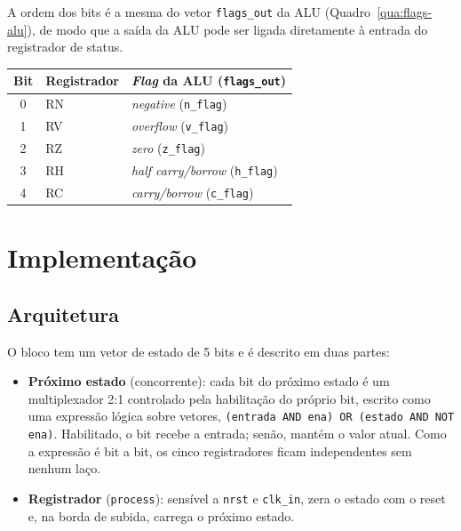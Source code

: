 A ordem dos bits é a mesma do vetor \texttt{flags\_out} da ALU (Quadro~\ref{qua:flags-alu}), de modo que a saída da ALU pode ser ligada diretamente à entrada do registrador de status.

\begin{quadro}[htb]
  \caption{Correspondência entre as \textit{flags} da ALU e os registradores de status.}
  \label{qua:flags-alu}
  \centering
  \begin{tabular}{cll}
    \hline
    Bit & Registrador & \textit{Flag} da ALU (\texttt{flags\_out}) \\ \hline
    0 & RN & \textit{negative} (\texttt{n\_flag}) \\
    1 & RV & \textit{overflow} (\texttt{v\_flag}) \\
    2 & RZ & \textit{zero} (\texttt{z\_flag}) \\
    3 & RH & \textit{half carry/borrow} (\texttt{h\_flag}) \\
    4 & RC & \textit{carry/borrow} (\texttt{c\_flag}) \\ \hline
  \end{tabular}
\end{quadro}

\section{Implementação}

\subsection{Arquitetura}

O bloco tem um vetor de estado de 5 bits e é descrito em duas partes:

\begin{itemize}
  \item \textbf{Próximo estado} (concorrente): cada bit do próximo estado é um multiplexador 2:1 controlado pela habilitação do próprio bit, escrito como uma expressão lógica sobre vetores, \texttt{(entrada AND ena) OR (estado AND NOT ena)}. Habilitado, o bit recebe a entrada; senão, mantém o valor atual. Como a expressão é bit a bit, os cinco registradores ficam independentes sem nenhum laço.
  \item \textbf{Registrador} (\texttt{process}): sensível a \texttt{nrst} e \texttt{clk\_in}, zera o estado com o reset e, na borda de subida, carrega o próximo estado.
\end{itemize}

